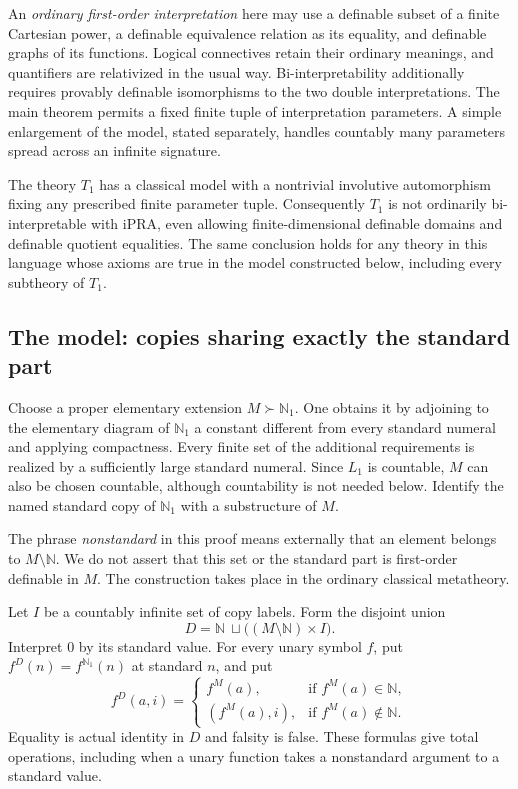 An \emph{ordinary first-order interpretation} here may use a definable
subset of a finite Cartesian power, a definable equivalence relation
as its equality, and definable graphs of its functions. Logical
connectives retain their ordinary meanings, and quantifiers are
relativized in the usual way. Bi-interpretability additionally requires
provably definable isomorphisms to the two double interpretations.
The main theorem permits a fixed finite tuple of interpretation
parameters. A simple enlargement of the model, stated separately,
handles countably many parameters spread across an infinite signature.

\begin{theorem}\label{thm:unary-amalgam}
The theory $T_1$ has a classical model with a nontrivial involutive
automorphism fixing any prescribed finite parameter tuple.
Consequently $T_1$ is not ordinarily bi-interpretable with iPRA,
even allowing finite-dimensional definable domains and definable
quotient equalities. The same conclusion holds for any theory in
this language whose axioms are true in the model constructed below,
including every subtheory of $T_1$.
\end{theorem}

\subsection{The model: copies sharing exactly the standard part}
\label{subsec:amalgam-model}

Choose a proper elementary extension
$M\succ\mathbb N_1$. One obtains it by adjoining to the elementary
diagram of $\mathbb N_1$ a constant different from every standard
numeral and applying compactness. Every finite set of the additional
requirements is realized by a sufficiently large standard numeral.
Since $L_1$ is countable, $M$ can also be chosen countable, although
countability is not needed below. Identify the named standard copy
of $\mathbb N_1$ with a substructure of $M$.

The phrase \emph{nonstandard} in this proof means externally that an
element belongs to $M\setminus\mathbb N$. We do not assert that
this set or the standard part is first-order definable in $M$.
The construction takes place in the ordinary classical metatheory.

Let $I$ be a countably infinite set of copy labels. Form the disjoint
union
\[
              D=\mathbb N\ \sqcup\bigl((M\setminus\mathbb N)\times I\bigr).
 \tag{D}\label{eq:amalgam-domain}
\]
Interpret $0$ by its standard value. For every unary symbol $f$, put
$f^D(n)=f^{\mathbb N_1}(n)$ at standard $n$, and put
\[
 f^D(a,i)=
 \begin{cases}
   f^M(a),&\text{if }f^M(a)\in\mathbb N,\\
   (f^M(a),i),&\text{if }f^M(a)\notin\mathbb N.
 \end{cases}
 \tag{F}\label{eq:amalgam-functions}
\]
Equality is actual identity in $D$ and falsity is false. These formulas
give total operations, including when a unary function takes a
nonstandard argument to a standard value.

